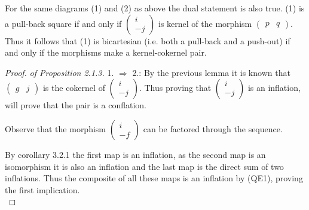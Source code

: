    \begin{corollary}
        For the same diagrams (1) and (2) as above the dual statement is also true. (1) is a pull-back square if and only if $\begin{pmatrix}
            i \\ -j
        \end{pmatrix}$ is kernel of the morphism $\begin{pmatrix}
            p & q
        \end{pmatrix}$. Thus it follows that (1) is bicartesian (i.e. both a pull-back and a push-out) if and only if the morphisms make a kernel-cokernel pair.
    \end{corollary}

    \begin{proof}\emph{of Proposition 2.1.3.} 
        1. $\Rightarrow$ 2.: By the previous lemma it is known that $\begin{pmatrix}
            g & j
        \end{pmatrix}$ is the cokernel of $\begin{pmatrix}
            i \\ -j
        \end{pmatrix}$. Thus proving that $\begin{pmatrix}
            i \\ -j
        \end{pmatrix}$ is an inflation, will prove that the pair is a conflation. 
        
        Observe that the morphism $\begin{pmatrix}
            i \\ -f
        \end{pmatrix}$ can be factored through the sequence. 
        \begin{center}
        \end{center}
        By corollary 3.2.1 the first map is an inflation, as the second map is an isomorphism it is also an inflation and the last map is the direct sum of two inflations. Thus the composite of all these maps is an inflation by (QE1), proving the first implication. \\


\end{proof}
